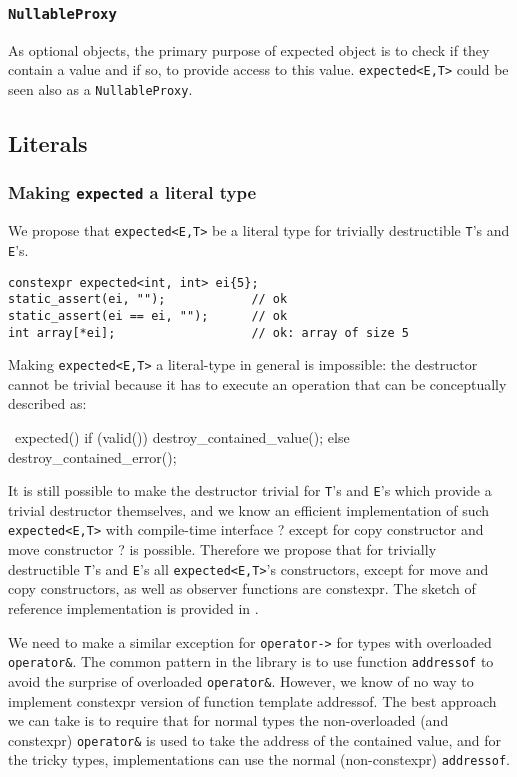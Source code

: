 \documentclass[a4paper,10pt]{article}
\newcommand{\cpp}[1]{\lstinline{#1}}
\begin{document}
\subsubsection{\cpp{NullableProxy}}

As optional objects, the primary purpose of expected object is to check if they contain a value and if so, to provide access to this value.  \cpp{expected<E,T>} could be seen also as a \cpp{NullableProxy}.  

\subsection{Literals}

\subsubsection{Making \cpp{expected} a literal type}

We propose that \cpp{expected<E,T>} be a literal type for trivially destructible \cpp{T}'s and \cpp{E}'s.

\begin{lstlisting}
constexpr expected<int, int> ei{5};
static_assert(ei, "");            // ok
static_assert(ei == ei, "");      // ok
int array[*ei];                   // ok: array of size 5 
\end{lstlisting}

Making \cpp{expected<E,T>} a literal-type in general is impossible: the destructor cannot be trivial because it has to execute an operation that can be conceptually described as:

~expected() {
  if (valid()) destroy_contained_value();
  else destroy_contained_error();
}

It is still possible to make the destructor trivial for \cpp{T}'s and \cpp{E}'s which provide a trivial destructor themselves, and we know an efficient implementation of such  \cpp{expected<E,T>}  with compile-time interface ? except for copy constructor and move constructor ? is possible. Therefore we propose that for trivially destructible \cpp{T}'s and \cpp{E}'s all \cpp{expected<E,T>}'s constructors, except for move and copy constructors, as well as observer functions are constexpr. The sketch of reference implementation is provided in \cite{boost.expected}.

We need to make a similar exception for \cpp{operator->} for types with overloaded \cpp{operator&}. The common pattern in the library is to use function \cpp{addressof} to avoid the surprise of overloaded \cpp{operator&}. However, we know of no way to implement constexpr version of function template addressof. The best approach we can take is to require that for normal types the non-overloaded (and constexpr) \cpp{operator&} is used to take the address of the contained value, and for the tricky types, implementations can use the normal (non-constexpr) \cpp{addressof}. 
\end{document}
